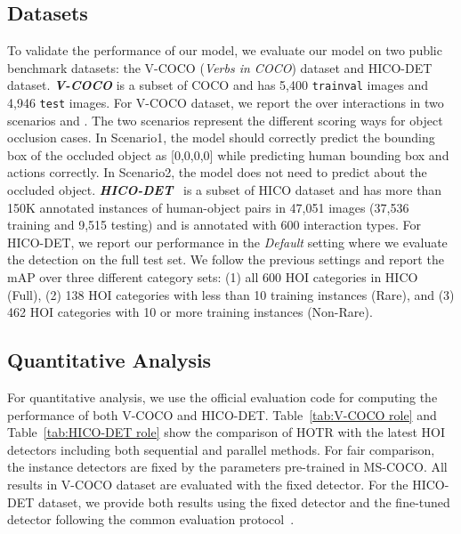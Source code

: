 \documentclass[final]{cvpr}
\begin{document}
\subsection{Datasets}
To validate the performance of our model, we evaluate our model on two public benchmark datasets: the V-COCO (\textit{Verbs in COCO}) dataset and HICO-DET dataset.
\textbf{\textit{V-COCO}} is a subset of COCO and has 5,400 \texttt{trainval} images and 4,946 \texttt{test} images.
For V-COCO dataset, we report the  over  interactions in two scenarios  and .
The two scenarios represent the different scoring ways for object occlusion cases. In Scenario1, the model should correctly predict the bounding box of the occluded object as [0,0,0,0] while predicting human bounding box and actions correctly.
In Scenario2, the model does not need to predict about the occluded object.
\textbf{\textit{HICO-DET}}~\cite{chao2018learning} is a subset of HICO dataset and has more than 150K annotated instances of human-object pairs in 47,051 images (37,536 training and 9,515 testing) and is annotated with 600  interaction types.
For HICO-DET, we report our performance in the \textit{Default} setting where we evaluate the detection on the full test set.
We follow the previous settings and report the mAP over three different category sets: (1) all 600 HOI categories in HICO (Full), (2) 138 HOI categories with less than 10 training instances (Rare), and (3) 462 HOI categories with 10 or more training instances (Non-Rare). \subsection{Quantitative Analysis}
For quantitative analysis, we use the official evaluation code for computing the performance of both V-COCO and HICO-DET.
Table~\ref{tab:V-COCO role} and Table~\ref{tab:HICO-DET role} show the comparison of HOTR with the latest HOI detectors including both sequential and parallel methods.
For fair comparison, the instance detectors are fixed by the parameters pre-trained in MS-COCO.
All results in V-COCO dataset are evaluated with the fixed detector.
For the HICO-DET dataset, we provide both results using the fixed detector and the fine-tuned detector following the common evaluation protocol~\cite{bansal2020detecting,li2019transferable,hou2020visual,liu2020consnet,gao2020drg,li2020hoi,bkim2020uniondet,liao2020ppdm}.
\end{document}
